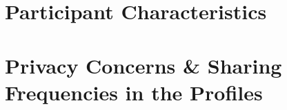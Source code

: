 \section{Participant Characteristics}\label{sec:participant_characteristics}



\section{Privacy Concerns \& Sharing Frequencies in the Profiles}\label{sec:concern_and_frequency_for_profiles}

\begin{table}[h]
    \centering
    \caption{Profiles and the distribution of their declared level of privacy concerns. Standard deviations for the averages are given in the parentheses.}
    \label{tab:profiles_and_concern}
\end{table}

